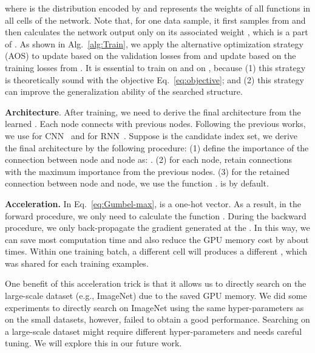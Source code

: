 \documentclass[10pt,twocolumn,letterpaper]{article}
\def\Algref#1{Alg.~\ref{#1}}
\def\Eqref#1{Eq.~\eqref{#1}}
\begin{document}
\noindent where  is the distribution encoded by  and  represents the weights of all functions in all cells of the network.
Note that, for one data sample, it first samples  from  and then calculates the network output only on its associated weight , which is a part of .
As shown in \Algref{alg:Train}, we apply the alternative optimization strategy (AOS) to update  based on the validation losses from  and update  based on the training losses from .
It is essential to train  on  and  on , because (1) this strategy is theoretically sound with the objective \Eqref{eq:objective}; and (2) this strategy can improve the generalization ability of the searched structure.








{\bf Architecture}.
After training, we need to derive the final architecture from the learned .
Each node connects with  previous nodes.
Following the previous works, we use  for CNN~\cite{Zoph_2018_CVPR,liu2019darts} and  for RNN~\cite{pmlr-v80-pham18a,liu2019darts}.
Suppose  is the candidate index set, we derive the final architecture by the following procedure:
(1) define the importance of the connection between node and node as: .
(2) for each node, retain  connections with the maximum importance from the previous nodes.
(3) for the retained connection between node and node, we use the function .
 is  by default.




{\bf Acceleration.}
In \Eqref{eq:Gumbel-max},  is a one-hot vector. As a result, in the forward procedure, we only need to calculate the function .
During the backward procedure, we only back-propagate the gradient generated at the .
In this way, we can save most computation time and also reduce the GPU memory cost by about  times.
Within one training batch, a different cell will produces a different , which was shared for each training examples.


One benefit of this acceleration trick is that it allows us to directly search on the large-scale dataset (e.g., ImageNet) due to the saved GPU memory. We did some experiments to directly search on ImageNet using the same hyper-parameters as on the small datasets, however, failed to obtain a good performance.
Searching on a large-scale dataset might require different hyper-parameters and needs careful tuning. We will explore this in our future work.
\end{document}
